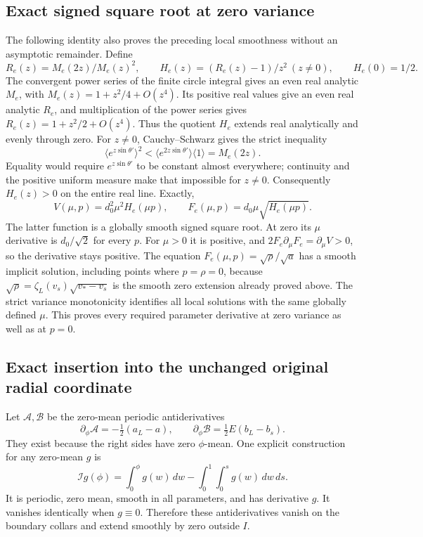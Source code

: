 \documentclass[10pt,a4paper]{article}
\begin{document}
\subsection{Exact signed square root at zero variance}
The following identity also proves the preceding local smoothness without an
asymptotic remainder. Define
\[
 R_e(z)=M_e(2z)/M_e(z)^2,\qquad
 H_e(z)=(R_e(z)-1)/z^2\ (z\ne0),\qquad H_e(0)=1/2.
\]
The convergent power series of the finite circle integral gives an even real
analytic $M_e$, with $M_e(z)=1+z^2/4+O(z^4)$. Its positive real values
give an even real analytic $R_e$, and multiplication of the power series gives
$R_e(z)=1+z^2/2+O(z^4)$. Thus the quotient $H_e$ extends real analytically
and evenly through zero. For $z\ne0$, Cauchy--Schwarz gives the strict inequality
\[
 \langle e^{z\sin\theta'}\rangle^2
 <\langle e^{2z\sin\theta'}\rangle\langle1\rangle=M_e(2z).
\]
Equality would require $e^{z\sin\theta'}$ to be constant almost everywhere;
continuity and the positive uniform measure make that impossible for $z\ne0$.
Consequently $H_e(z)>0$ on the entire real line. Exactly,
\[
 V(\mu,p)=d_0^2\mu^2H_e(\mu p),\qquad
 F_e(\mu,p)=d_0\mu\sqrt{H_e(\mu p)}.
\]
The latter function is a globally smooth signed square root. At zero its
$\mu$ derivative is $d_0/\sqrt2$ for every $p$. For $\mu>0$ it is positive,
and $2F_e\partial_\mu F_e=\partial_\mu V>0$, so the derivative stays
positive. The equation $F_e(\mu,p)=\sqrt\rho/\sqrt a$ has a smooth
implicit solution, including points where $p=\rho=0$, because
$\sqrt\rho=\zeta_L(v_s)\sqrt{v_*-v_s}$ is the smooth zero extension
already proved above. The strict variance monotonicity identifies all local
solutions with the same globally defined $\mu$. This proves every required
parameter derivative at zero variance as well as at $p=0$.

\subsection{Exact insertion into the unchanged original radial coordinate}\label{pa:exact-insertion-into-the-unchanged-original-radial-coordinate}

Let \(\mathcal A,\mathcal B\) be the zero-mean periodic antiderivatives \[
\partial_\phi\mathcal A=-\tfrac12(a_L-a),\qquad
\partial_\phi\mathcal B=\tfrac12E(b_L-b_s).
\] They exist because the right sides have zero \(\phi\)-mean. One explicit construction for any zero-mean \(g\) is \[
\mathcal I g(\phi)=\int_0^\phi g(w)\,dw-
\int_0^1\int_0^s g(w)\,dw\,ds.
\] It is periodic, zero mean, smooth in all parameters, and has derivative \(g\). It vanishes identically when \(g\equiv0\). Therefore these antiderivatives vanish on the boundary collars and extend smoothly by zero outside \(I\).
\end{document}
